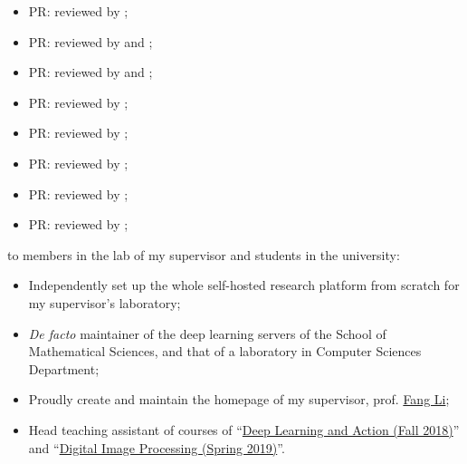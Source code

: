 \begin{itemize}
    \item PR:  reviewed by \mbauman;
    \item PR:  reviewed by \evizero and \timholy;
    \item PR:  reviewed by \evizero and \timholy;
    \item PR:  reviewed by \julio;
    \item PR:  reviewed by \evizero;
    \item PR:  reviewed by \timholy;
    \item PR:  reviewed by \mikeinnes;
    \item PR:  reviewed by \mikeinnes;
\end{itemize}
to members in the lab of my supervisor and students in the university:
\begin{itemize}
    \item Independently set up the whole self-hosted research platform from scratch for my supervisor's laboratory;
    \item \textit{De facto} maintainer of the deep learning servers of the School of Mathematical Sciences, and that of a laboratory in Computer Sciences Department;
    \item Proudly create and maintain the homepage of my supervisor, prof. \href{http://math.ecnu.edu.cn/~fli/}{\textsf{Fang Li}};
    \item Head teaching assistant of courses of ``\href{http://math.ecnu.edu.cn/~fli/Teaching/DeepLearning/Fall2018/index.html}{Deep Learning and Action (Fall 2018)}''  and ``\href{http://math.ecnu.edu.cn/~fli/Teaching/DigitalImageProcessing/Spring2019/index.html}{Digital Image Processing (Spring 2019)}''.
\end{itemize}

